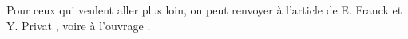 \documentclass[a4paper,12pt]{article}
\begin{document}
Pour ceux qui veulent aller plus loin, on peut renvoyer à l'article de E. Franck et Y. Privat \cite{FrankPrivat}, voire à l'ouvrage \cite{SuttonBarto}.
% 
% 
% 
% 
% 
% 
% 
% 
% 
% 
% 
% 
\end{document}
